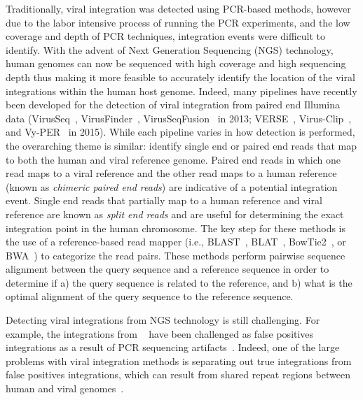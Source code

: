 \documentclass{bioinfo}
\begin{document}
Traditionally, viral integration was detected using PCR-based methods, however due to the labor intensive process of running the PCR experiments, and the low coverage and depth of PCR techniques, integration events were difficult to identify.  With the advent of Next Generation Sequencing (NGS) technology, human genomes can now be sequenced with high coverage and high sequencing depth thus making it more feasible to accurately identify the location of the viral integrations within the human host genome.  Indeed, many pipelines have recently been developed for the detection of viral integration from paired end Illumina data (VirusSeq~\cite{Chen2013}, VirusFinder~\cite{Wang2013}, VirusSeqFusion~\cite{Li2013} in 2013; VERSE~\cite{Wang2015}, Virus-Clip~\cite{Ho2015}, and Vy-PER~\cite{Forster2015} in 2015).  While each pipeline varies in how detection is performed, the overarching theme is similar: identify single end or paired end reads that map to both the human and viral reference genome.  Paired end reads in which one read maps to a viral reference and the other read maps to a human reference (known as \emph{chimeric paired end reads}) are indicative of a potential integration event.  Single end reads that partially map to a human reference and viral reference are known as \emph{split end reads} and are useful for determining the exact integration point in the human chromosome.  The key step for these methods is the use of a reference-based read mapper (i.e., BLAST~\cite{Altschul1990}, BLAT~\cite{Kent2002}, BowTie2~\cite{Langmead2012}, or BWA~\cite{Li2009}) to categorize the read pairs.  These methods perform pairwise sequence alignment between the query sequence and a reference sequence in order to determine if a) the query sequence is related to the reference, and b) what is the optimal alignment of the query sequence to the reference sequence.

Detecting viral integrations from NGS technology is still challenging.  For example, the integrations from ~\cite{Hu2015} have been challenged as false positives integrations as a result of PCR sequencing artifacts~\cite{Dyer2015}.  Indeed, one of the large problems with viral integration methods is separating out true integrations from false positives integrations, which can result from shared repeat regions between human and viral genomes~\cite{Forster2015}.  
\end{document}
